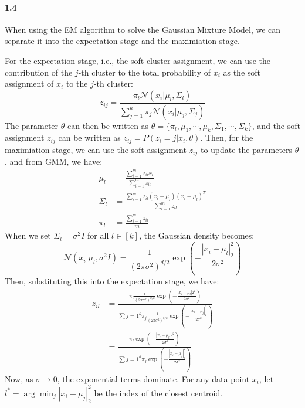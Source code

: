 \documentclass[11pt]{article}
\begin{document}
\paragraph{1.4}
When using the EM algorithm to solve the Gaussian Mixture Model, we can separate it into the expectation stage and the maximiation stage.

For the expectation stage, i.e., the soft cluster assignment, we can use the contribution of the $j$-th cluster to the total probability of $x_i$ as the soft assignment of $x_i$ to the $j$-th cluster:
\begin{equation}
  z_{ij} = \frac{\pi_l \mathcal{N}(x_i|\mu_l, \Sigma_l)}{\sum_{j=1}^k \pi_j \mathcal{N}(x_i|\mu_j, \Sigma_j)}
\end{equation}
The parameter $\theta$ can then be written as $\theta = \{\pi_l, \mu_1, \cdots, \mu_k, \Sigma_1, \cdots, \Sigma_k\}$, and the soft assignment $z_{ij}$ can be written as $z_{ij} = P(z_i = j|x_i, \theta)$.
Then, for the maximiation stage, we can use the soft assignment $z_{ij}$ to update the parameters $\theta$, and from GMM, we have:
\begin{equation}
  \begin{split}
    \mu_l &= \frac{\sum_{i=1}^m z_{il} x_i}{\sum_{i=1}^m z_{il}} \\
    \Sigma_l &= \frac{\sum_{i=1}^m z_{il} (x_i - \mu_l)(x_i - \mu_l)^T}{\sum_{i=1}^m z_{il}} \\
    \pi_l &= \frac{\sum_{i=1}^m z_{il}}{m}
  \end{split}
\end{equation}
When we set $\Sigma_l = \sigma^2I$ for all $l \in [k]$, the Gaussian density becomes:
\begin{equation}
  \mathcal{N}(x_i|\mu_l, \sigma^2I) = \frac{1}{(2\pi\sigma^2)^{d/2}} \exp(-\frac{|x_i - \mu_l|_2^2}{2\sigma^2})
\end{equation}
Then, substituting this into the expectation stage, we have:
\begin{equation}
  \begin{split}
    z_{il} &= \frac{\pi_l \frac{1}{(2\pi\sigma^2)^{d/2}} \exp(-\frac{|x_i - \mu_l|2^2}{2\sigma^2})}{\sum{j=1}^k \pi_j \frac{1}{(2\pi\sigma^2)^{d/2}} \exp(-\frac{|x_i - \mu_j|_2^2}{2\sigma^2})} \\ 
  &= \frac{\pi_l \exp(-\frac{|x_i - \mu_l|2^2}{2\sigma^2})}{\sum{j=1}^k \pi_j \exp(-\frac{|x_i - \mu_j|_2^2}{2\sigma^2})}
  \end{split}
\end{equation}
Now, as $\sigma \to 0$, the exponential terms dominate. For any data point $x_i$, let $l^* = \arg\min_j |x_i - \mu_j|_2^2$ be the index of the closest centroid.
\end{document}
